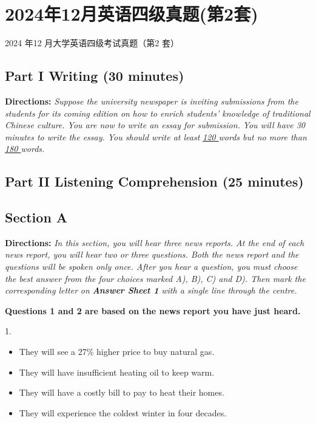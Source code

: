 \documentclass[UTF8,11pt]{ctexart}
\begin{document}
\section*{2024年12月英语四级真题(第2套)}
2024 年12 月大学英语四级考试真题（第2 套）


\subsection*{\textbf{Part I Writing} \textbf{(30 minutes)}}


\textbf{Directions:} \textit{Suppose the university newspaper is inviting submissions from the students for its coming edition on} \textit{how to enrich students’ knowledge of traditional Chinese culture. You are now to write an essay for submission.} \textit{You will have 30 minutes to write the essay. You should write at least }\textit{\uline{120 }}\textit{words but no more than }\textit{\uline{180 }}\textit{words.}


\subsection*{\textbf{Part II} \textbf{Listening Comprehension} \textbf{(25 minutes)}}


\subsection*{\textbf{Section A}}


\textbf{Directions:} \textit{In this section, you will hear three news reports. At the end of each news report, you will hear two or} \textit{three questions. Both the news report and the questions will be spoken only once. After you hear a question, you} \textit{must choose the best answer from the four choices marked A), B), C) and D). Then mark the corresponding letter} \textit{on }\textbf{\textit{Answer Sheet 1}}\textit{ with a single line through the centre.}


\textbf{Questions 1 and 2 are based on the news report you have just heard.}


1.


\begin{itemize}[leftmargin=2em,itemsep=.2em,topsep=.4em]\item[A.] They will see a 27\% higher price to buy natural gas.
\item[B.] They will have insufficient heating oil to keep warm.
\item[C.] They will have a costly bill to pay to heat their homes.
\item[D.] They will experience the coldest winter in four decades.
\end{itemize}
\end{document}
